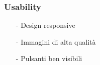 \documentclass[12pt, a4paper, oneside]{book}
\begin{document}
        \subsubsection*{Usability}
            \begin{itemize}
                \item [-] Design responsive
                \item [-] Immagini di alta qualità
                \item [-] Pulsanti ben visibili
            \end{itemize}
\end{document}
